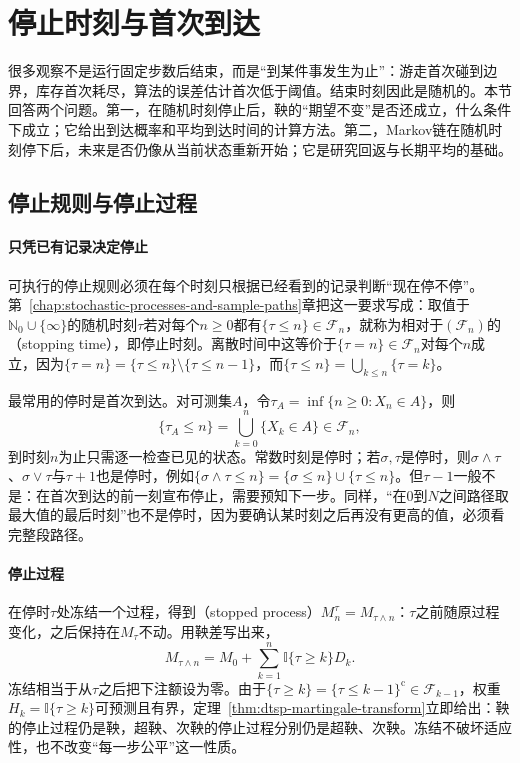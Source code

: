 \section{停止时刻与首次到达}
\label{sec:dtsp-stopping}
\label{sec:stoch-martingales-stopping-sequential-concentration}

很多观察不是运行固定步数后结束，而是“到某件事发生为止”：游走首次碰到边界，库存首次耗尽，算法的误差估计首次低于阈值。结束时刻因此是随机的。本节回答两个问题。第一，在随机时刻停止后，鞅的“期望不变”是否还成立，什么条件下成立；它给出到达概率和平均到达时间的计算方法。第二，Markov链在随机时刻停下后，未来是否仍像从当前状态重新开始；它是研究回返与长期平均的基础。

\subsection{停止规则与停止过程}
\label{sec:dtsp-stopping-rules}

\paragraph{只凭已有记录决定停止}
可执行的停止规则必须在每个时刻只根据已经看到的记录判断“现在停不停”。第~\ref{chap:stochastic-processes-and-sample-paths}章把这一要求写成：取值于$\mathbb N_0\cup\{\infty\}$的随机时刻$\tau$若对每个$n\geq0$都有$\{\tau\leq n\}\in\mathcal F_n$，就称为相对于$(\mathcal F_n)$的（stopping time），即停止时刻。离散时间中这等价于$\{\tau=n\}\in\mathcal F_n$对每个$n$成立，因为$\{\tau=n\}=\{\tau\leq n\}\setminus\{\tau\leq n-1\}$，而$\{\tau\leq n\}=\bigcup_{k\leq n}\{\tau=k\}$。

最常用的停时是首次到达。对可测集$A$，令$\tau_A=\inf\{n\geq0:X_n\in A\}$，则
\[
  \{\tau_A\leq n\}=\bigcup_{k=0}^n\{X_k\in A\}\in\mathcal F_n,
\]
到时刻$n$为止只需逐一检查已见的状态。常数时刻是停时；若$\sigma,\tau$是停时，则$\sigma\wedge\tau$、$\sigma\vee\tau$与$\tau+1$也是停时，例如$\{\sigma\wedge\tau\leq n\}=\{\sigma\leq n\}\cup\{\tau\leq n\}$。但$\tau-1$一般不是：在首次到达的前一刻宣布停止，需要预知下一步。同样，“在$0$到$N$之间路径取最大值的最后时刻”也不是停时，因为要确认某时刻之后再没有更高的值，必须看完整段路径。

\paragraph{停止过程}
在停时$\tau$处冻结一个过程，得到（stopped process）$M^{\tau}_n=M_{\tau\wedge n}$：$\tau$之前随原过程变化，之后保持在$M_\tau$不动。用鞅差写出来，
\begin{equation}
  M_{\tau\wedge n}=M_0+\sum_{k=1}^n\mathbb I\{\tau\geq k\}D_k.
  \label{eq:dtsp-stopped-process}
\end{equation}
冻结相当于从$\tau$之后把下注额设为零。由于$\{\tau\geq k\}=\{\tau\leq k-1\}^{\mathrm c}\in\mathcal F_{k-1}$，权重$H_k=\mathbb I\{\tau\geq k\}$可预测且有界，定理~\ref{thm:dtsp-martingale-transform}立即给出：鞅的停止过程仍是鞅，超鞅、次鞅的停止过程分别仍是超鞅、次鞅。冻结不破坏适应性，也不改变“每一步公平”这一性质。

